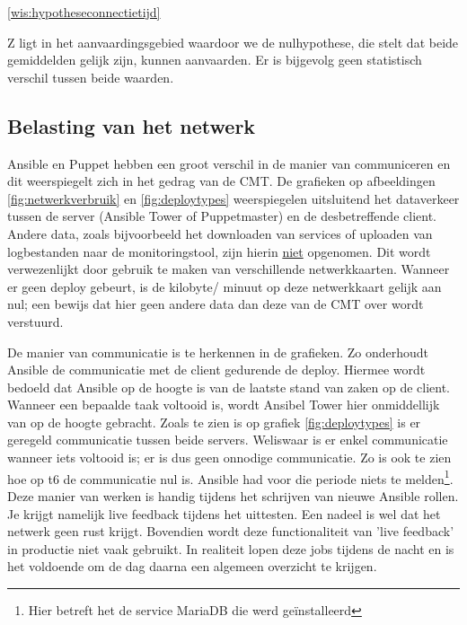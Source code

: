 \ref{wis:hypotheseconnectietijd}

Z ligt in het aanvaardingsgebied waardoor we de nulhypothese, die stelt dat beide gemiddelden gelijk zijn, kunnen aanvaarden. Er is bijgevolg geen statistisch verschil tussen beide waarden.

\subsection{Belasting van het netwerk}

Ansible en Puppet hebben een groot verschil in de manier van communiceren en dit weerspiegelt zich in het gedrag van de \gls{CMT}. De grafieken op afbeeldingen \ref{fig:netwerkverbruik} en \ref{fig:deploytypes} weerspiegelen uitsluitend het dataverkeer tussen de server (Ansible Tower of Puppetmaster) en de desbetreffende client. Andere data, zoals bijvoorbeeld het downloaden van services of uploaden van logbestanden naar de monitoringstool, zijn hierin \underline{niet} opgenomen. Dit wordt verwezenlijkt door gebruik te maken van verschillende netwerkkaarten. Wanneer er geen deploy gebeurt, is de kilobyte/ minuut op deze netwerkkaart gelijk aan nul; een bewijs dat hier geen andere data dan deze van de \gls{CMT} over wordt verstuurd.  \newline

De manier van communicatie is te herkennen in de grafieken. Zo onderhoudt Ansible de communicatie met de client gedurende de deploy. Hiermee wordt bedoeld dat Ansible op de hoogte is van de laatste stand van zaken op de client. Wanneer een bepaalde taak voltooid is, wordt Ansibel Tower hier onmiddellijk van op de hoogte gebracht. Zoals te zien is op grafiek \ref{fig:deploytypes} is er geregeld communicatie tussen beide servers. Weliswaar is er enkel communicatie wanneer iets voltooid is; er is dus geen onnodige communicatie. Zo is ook te zien hoe op t6 de communicatie nul is. Ansible had voor die periode niets te melden\footnote{Hier betreft het de service MariaDB die werd ge\"installeerd}. \newline
 Deze manier van werken is handig tijdens het schrijven van nieuwe Ansible rollen. Je krijgt namelijk live feedback tijdens het uittesten. Een nadeel is wel dat het netwerk geen rust krijgt. Bovendien wordt deze functionaliteit van 'live feedback' in productie niet vaak gebruikt. In realiteit lopen deze jobs tijdens de nacht en is het voldoende om de dag daarna een algemeen overzicht te krijgen.\newline

